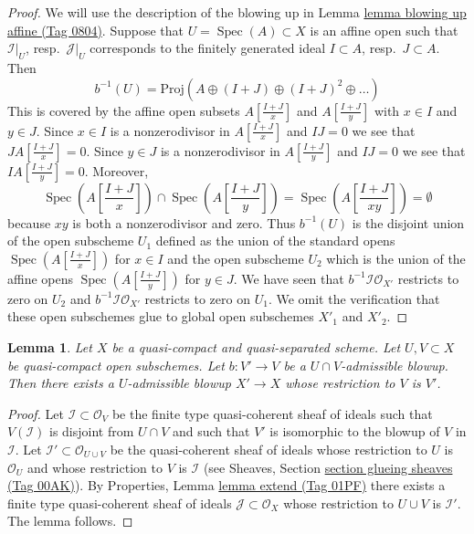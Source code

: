 \documentclass{amsart}
\theoremstyle{plain}
\newtheorem{lemma}[subsection]{Lemma}
\theoremstyle{definition}
\theoremstyle{remark}
\numberwithin{equation}{subsection}
\def\Spec{\mathop{\mathrm{Spec}}}
\begin{document}
\begin{proof}
\medskip\noindent
We will use the description of the blowing up in
Lemma \href{https://stacks.math.columbia.edu/tag/0804}{lemma blowing up affine (Tag 0804)}. Suppose that $U = \Spec(A) \subset X$
is an affine open such that $\mathcal{I}|_U$, resp.\ $\mathcal{J}|_U$
corresponds to the finitely generated ideal $I \subset A$, resp.\ $J \subset A$.
Then
$$
b^{-1}(U) = \text{Proj}(A \oplus (I + J) \oplus (I + J)^2 \oplus \ldots)
$$
This is covered by the affine open subsets $A[\frac{I + J}{x}]$
and $A[\frac{I + J}{y}]$ with $x \in I$ and $y \in J$. Since $x \in I$ is a
nonzerodivisor in $A[\frac{I + J}{x}]$ and $IJ = 0$ we see that
$J A[\frac{I + J}{x}] = 0$. Since $y \in J$ is a nonzerodivisor
in $A[\frac{I + J}{y}]$ and $IJ = 0$ we see that
$I A[\frac{I + J}{y}] = 0$. Moreover,
$$
\Spec(A[\textstyle{\frac{I + J}{x}}]) \cap
\Spec(A[\textstyle{\frac{I + J}{y}}]) =
\Spec(A[\textstyle{\frac{I + J}{xy}}]) = \emptyset
$$
because $xy$ is both a nonzerodivisor and zero. Thus $b^{-1}(U)$
is the disjoint union of the open subscheme $U_1$ defined as the union
of the standard opens $\Spec(A[\frac{I + J}{x}])$ for $x \in I$ and the open
subscheme $U_2$ which is the union of the affine opens
$\Spec(A[\frac{I + J}{y}])$ for $y \in J$. We have seen that
$b^{-1}\mathcal{I}\mathcal{O}_{X'}$ restricts to zero on $U_2$
and $b^{-1}\mathcal{I}\mathcal{O}_{X'}$ restricts to zero on $U_1$.
We omit the verification that these open subschemes glue to global
open subschemes $X'_1$ and $X'_2$.
\end{proof}


\begin{lemma}
\label{divisors-lemma-extend-admissible-blowups}
Let $X$ be a quasi-compact and quasi-separated scheme.
Let $U, V \subset X$ be quasi-compact open subschemes.
Let $b : V' \to V$ be a $U \cap V$-admissible blowup.
Then there exists a $U$-admissible blowup $X' \to X$
whose restriction to $V$ is $V'$.
\end{lemma}

\begin{proof}
Let $\mathcal{I} \subset \mathcal{O}_V$ be the finite type
quasi-coherent sheaf of ideals such that $V(\mathcal{I})$ is
disjoint from $U \cap V$ and such that $V'$ is isomorphic to the
blowup of $V$ in $\mathcal{I}$. Let
$\mathcal{I}' \subset \mathcal{O}_{U \cup V}$ be the quasi-coherent
sheaf of ideals whose restriction to $U$ is $\mathcal{O}_U$ and
whose restriction to $V$ is $\mathcal{I}$ (see Sheaves, Section
\href{https://stacks.math.columbia.edu/tag/00AK}{section glueing sheaves (Tag 00AK)}).
By Properties, Lemma \href{https://stacks.math.columbia.edu/tag/01PF}{lemma extend (Tag 01PF)}
there exists a finite type quasi-coherent sheaf of ideals
$\mathcal{J} \subset \mathcal{O}_X$ whose restriction to $U \cup V$ is
$\mathcal{I}'$. The lemma follows.
\end{proof}
\end{document}
